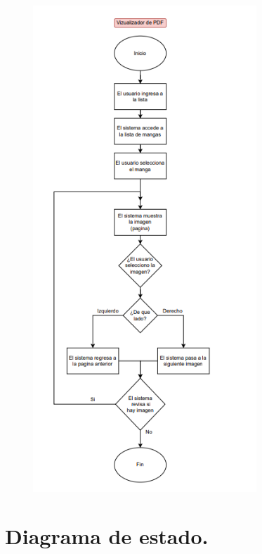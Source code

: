 \documentclass[12pt]{article}
\begin{document}
\begin{figure}[htbp]
	\centering
		\includegraphics[width=0.75\textwidth]{Screenshot 2023-10-05 114725.png}
	\label{fig:Screenshot 2023-10-05 114725}
\end{figure}

\newpage

\section{Diagrama de estado.}
\end{document}
